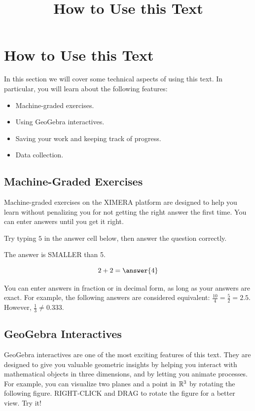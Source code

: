 \documentclass{ximera}
\title{How to Use this Text} \license{CC BY-NC-SA 4.0}
\begin{document}
\begin{abstract}
\end{abstract}
\maketitle



\section*{How to Use this Text}
In this section we will cover some technical aspects of using this text.  In particular, you will learn about the following features:
\begin{itemize}
    \item Machine-graded exercises.
    \item Using GeoGebra interactives.
    \item Saving your work and keeping track of progress.
    \item Data collection.
\end{itemize}

\subsection*{Machine-Graded Exercises}
Machine-graded exercises on the XIMERA platform are designed to help you learn without penalizing you for not getting the right answer the first time.  You can enter answers until you get it right.  
\begin{question}
Try typing $5$ in the answer cell below, then answer the question correctly.
\begin{hint} %
    The answer is SMALLER than 5.
\end{hint}
$$2+2=\answer{4}$$
\end{question}
You can enter answers in fraction or in decimal form, as long as your answers are exact.  For example, the following answers are considered equivalent: $\frac{10}{4}=\frac{5}{2}=2.5$.  However, $\frac{1}{3}\neq 0.333$.

\subsection*{GeoGebra Interactives}
GeoGebra interactives are one of the most exciting features of this text.  They are designed to give you valuable geometric insights by helping you interact with mathematical objects in three dimensions, and by letting you animate processes.  For example, you can visualize two planes and a point in $\mathbb{R}^3$ by rotating the following figure.  RIGHT-CLICK and DRAG to rotate the figure for a better view.  Try it!
\end{document}
